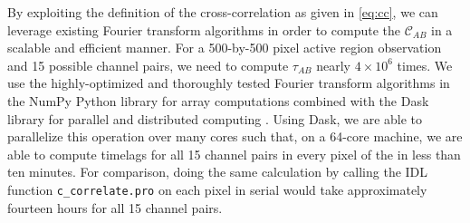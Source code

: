 By exploiting the definition of the cross-correlation as given in \autoref{eq:cc}, we can leverage existing Fourier transform algorithms in order to compute the $\mathcal{C}_{AB}$ in a scalable and efficient manner. For a 500-by-500 pixel active region observation and 15 possible channel pairs, we need to compute $\tau_{AB}$ nearly $4\times10^6$ times. We use the highly-optimized and thoroughly tested Fourier transform algorithms in the NumPy Python library for array computations \citep{oliphant_guide_2006} combined with the Dask library for parallel and distributed computing \citep{dask_development_team_dask_2016}. Using Dask, we are able to parallelize this operation over many cores such that, on a 64-core machine, we are able to compute timelags for all 15 channel pairs in every pixel of the \AR{} in less than ten minutes. For comparison, doing the same calculation by calling the IDL function \texttt{c\_correlate.pro} on each pixel in serial would take approximately fourteen hours for all 15 channel pairs.

